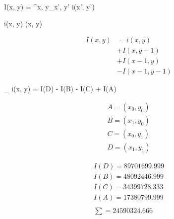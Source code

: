 I(x, y) = \sum^{x, y}_{x', y'} i(x', y')

i(x, y)
(x, y)

\begin{align}
I(x, y) & = i (x, y) \nonumber \\
& + I(x, y - 1) \nonumber \\
& + I (x - 1, y) \nonumber \\
& - I(x - 1, y -1) \nonumber
\end{align}

\sum_{} i(x, y) = I(D) - I(B) - I(C) + I(A) 

\begin{align}
A = (x_0, y_0) \nonumber \\
B = (x_1, y_0) \nonumber \\
C = (x_0, y_1) \nonumber \\
D = (x_1, y_1) \nonumber
\end{align}

\begin{align}
I(D) = 89701699.999 \nonumber \\
I(B) = 48092446.999 \nonumber \\
I(C) = 34399728.333 \nonumber \\
I(A) = 17380799.999 \nonumber \\
\nonumber \\
\sum = 24590324.666 \nonumber
\end{align}
